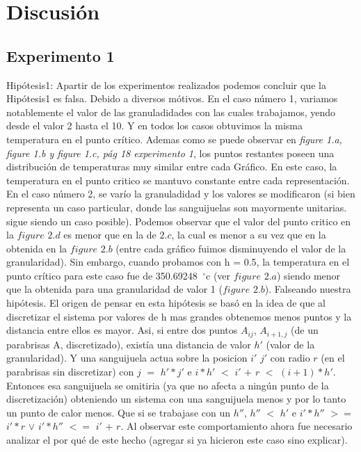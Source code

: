 \section{Discusión}


\subsection{Experimento 1}
Hipótesis1: Apartir de los experimentos realizados podemos concluir que la Hipótesis1 es falsa. Debido a diversos mótivos. En el caso número 1, variamos notablemente el valor de las granuladidades con las cuales trabajamos, yendo desde el valor 2 hasta el 10. Y en todos los casos obtuvimos la misma temperatura en el punto crítico. Ademas como se puede observar en \textit{figure 1.a, figure 1.b y figure 1.c, pág 18 \textit{experimento 1}}, los puntos restantes poseen una distribución de temperaturas muy similar entre cada Gráfico. En este caso, la temperatura en el punto critico se mantuvo constante entre cada representación.
En el caso número 2, se varío la granuladidad y los valores se modificaron (si bien representa un caso particular, donde las sanguijuelas son mayormente unitarias. sigue siendo un caso posible). Podemos observar que el valor del punto critico en la $figure$ $2.d$ es menor que en la de $2.c$, la cual es menor a su vez que en la obtenida en la $figure$ $2.b$  (entre cada gráfico fuimos disminuyendo el valor de la granularidad). Sin embargo, cuando probamos con h = 0.5, la temperatura en el punto crítico para este caso fue de 350.69248\hspace{-1.5mm}$\phantom{a}^{\circ}$c (ver $figure$ $2.a$) siendo menor que la obtenida para una granularidad de valor 1 ($figure$ $2.b$). Falseando nuestra hipótesis. \newline
El origen de pensar en esta hipótesis se basó en la idea de que al discretizar el sistema por valores de h mas grandes obtenemos menos puntos y la distancia entre ellos es mayor. Asi, si entre dos puntos $A_{ij}$, $A_{i+1,j}$ (de un parabrisas A, discretizado), existía una distancia de valor $h'$ (valor de la granularidad). Y una sanguijuela actua sobre la posicion $i'$ $j'$ con radio $r$ (en el parabrisas sin discretizar) con $j$ $=$ $h'*j'$ e $i*h'$ $<$ $i'$ $+$ $r$ $<$ $(i+1)*h'$. Entonces esa sanguijuela se omitiria (ya que no afecta a ningún punto de la discretización) obteniendo un sistema con una sanguijuela menos y por lo tanto un punto de calor menos. Que si se trabajase con un $h''$, $h''$ $<$ $h'$ e $i'*h''$ $>=$ $i'*r$ $\vee$ $i'*h''$ $<=$ $i'$ $+$ $r$. Al observar este comportamiento ahora fue necesario analizar el por qué de este hecho (agregar si ya hicieron este caso sino explicar).\newline \newline

